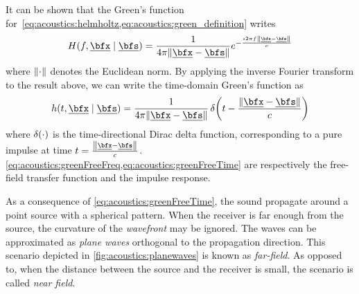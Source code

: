 It can be shown  that the Green's function for~\cref{eq:acoustics:helmholtz,eq:acoustics:green_definition} writes
\begin{equation}
    \label{eq:acoustics:greenFreeFreq}
    H(f, \positionMicrophone \mid \positionSource) = \frac{1}{4 \pi \norm{\positionMicrophone - \positionSource}} e^{- \frac{\Ii 2 \pi f \norm{\positionMicrophone - \positionSource}}{\speedOfSound}}
\end{equation}
where $\norm{\cdot}$ denotes the Euclidean norm. By applying the inverse Fourier transform to the result above, we can write the time-domain Green's function as
\begin{equation}
    \label{eq:acoustics:greenFreeTime}
    h(t, \positionMicrophone \mid \positionSource) =
        \frac{1}{4 \pi \norm{\positionMicrophone - \positionSource}}
        \diracOf{t - \frac{\norm{\positionMicrophone - \positionSource}}{\speedOfSound}}
\end{equation}
where $\diracOf{\cdot}$ is the time-directional Dirac delta function,
corresponding to a pure impulse at time $t = \tfrac{\norm{\positionMicrophone - \positionSource}}{\speedOfSound}$.
\\\cref{eq:acoustics:greenFreeFreq,eq:acoustics:greenFreeTime} are respectively the free-field transfer function and the impulse response.

As a consequence of \cref{eq:acoustics:greenFreeTime}, the sound propagate around a point source with a spherical pattern.
When the receiver is far enough from the source, the curvature of the \textit{wavefront} may be ignored.
The waves can be approximated as \textit{plane waves} orthogonal to the propagation direction.
This scenario depicted in \cref{fig:acoustics:planewaves} is known as \textit{far-field}.
As opposed to, when the distance between the source and the receiver is small, the scenario is called \textit{near field}.

